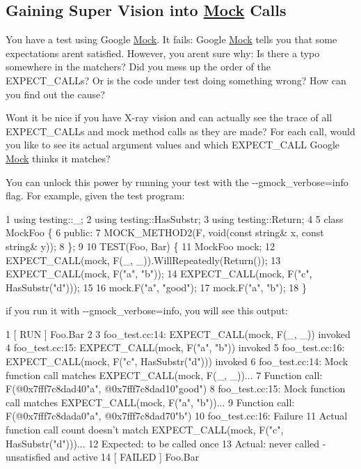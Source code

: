 \subsection*{Gaining Super Vision into \hyperlink{class_mock}{Mock} Calls}

You have a test using Google \hyperlink{class_mock}{Mock}. It fails\+: Google \hyperlink{class_mock}{Mock} tells you that some expectations aren\textquotesingle{}t satisfied. However, you aren\textquotesingle{}t sure why\+: Is there a typo somewhere in the matchers? Did you mess up the order of the {\ttfamily E\+X\+P\+E\+C\+T\+\_\+\+C\+A\+LL}s? Or is the code under test doing something wrong? How can you find out the cause?

Won\textquotesingle{}t it be nice if you have X-\/ray vision and can actually see the trace of all {\ttfamily E\+X\+P\+E\+C\+T\+\_\+\+C\+A\+LL}s and mock method calls as they are made? For each call, would you like to see its actual argument values and which {\ttfamily E\+X\+P\+E\+C\+T\+\_\+\+C\+A\+LL} Google \hyperlink{class_mock}{Mock} thinks it matches?

You can unlock this power by running your test with the {\ttfamily -\/-\/gmock\+\_\+verbose=info} flag. For example, given the test program\+:


\begin{DoxyCode}
1 using testing::\_;
2 using testing::HasSubstr;
3 using testing::Return;
4 
5 class MockFoo \{
6  public:
7   MOCK\_METHOD2(F, void(const string& x, const string& y));
8 \};
9 
10 TEST(Foo, Bar) \{
11   MockFoo mock;
12   EXPECT\_CALL(mock, F(\_, \_)).WillRepeatedly(Return());
13   EXPECT\_CALL(mock, F("a", "b"));
14   EXPECT\_CALL(mock, F("c", HasSubstr("d")));
15 
16   mock.F("a", "good");
17   mock.F("a", "b");
18 \}
\end{DoxyCode}


if you run it with {\ttfamily -\/-\/gmock\+\_\+verbose=info}, you will see this output\+:


\begin{DoxyCode}
1 [ RUN      ] Foo.Bar
2 
3 foo\_test.cc:14: EXPECT\_CALL(mock, F(\_, \_)) invoked
4 foo\_test.cc:15: EXPECT\_CALL(mock, F("a", "b")) invoked
5 foo\_test.cc:16: EXPECT\_CALL(mock, F("c", HasSubstr("d"))) invoked
6 foo\_test.cc:14: Mock function call matches EXPECT\_CALL(mock, F(\_, \_))...
7     Function call: F(@0x7fff7c8dad40"a", @0x7fff7c8dad10"good")
8 foo\_test.cc:15: Mock function call matches EXPECT\_CALL(mock, F("a", "b"))...
9     Function call: F(@0x7fff7c8dada0"a", @0x7fff7c8dad70"b")
10 foo\_test.cc:16: Failure
11 Actual function call count doesn't match EXPECT\_CALL(mock, F("c", HasSubstr("d")))...
12          Expected: to be called once
13            Actual: never called - unsatisfied and active
14 [  FAILED  ] Foo.Bar
\end{DoxyCode}



